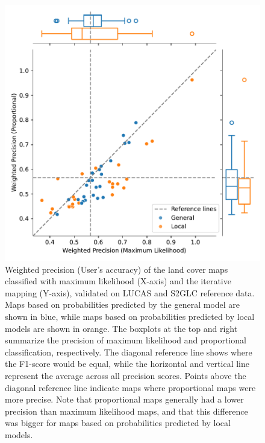     \begin{figure}[H]
        \centering
        \includegraphics[width=\linewidth]{figs_04/fig9_jointplot_precision.pdf}
        \caption{Weighted precision (User's accuracy) of the land cover maps classified with maximum likelihood (X-axis) and the iterative mapping (Y-axis), validated on LUCAS and S2GLC reference data. Maps based on probabilities predicted by the general model are shown in blue, while maps based on probabilities predicted by local models are shown in orange. The boxplots at the top and right summarize the precision of maximum likelihood and proportional classification, respectively. The diagonal reference line shows where the F1-score would be equal, while the horizontal and vertical line represent the average across all precision scores. Points above the diagonal reference line indicate maps where proportional maps were more precise. 
        Note that proportional maps generally had a lower precision than maximum likelihood maps, and that this difference was bigger for maps based on probabilities predicted by local models.}
        \label{fig:precision}
    \end{figure}

